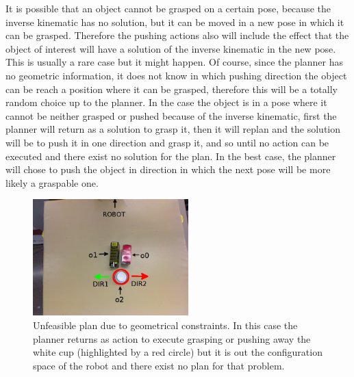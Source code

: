 

It is possible that an object cannot be grasped on a certain pose, because the inverse kinematic has no solution, but it can be moved in a new pose in which it can be grasped. Therefore the pushing actions also will include the effect that the object of interest will have a solution of the inverse kinematic in the new pose. This is usually a rare case but it might happen. Of course, since the planner has no geometric information, it does not know in which pushing direction the object can be reach a position where it can be grasped, therefore this will be a totally random choice up to the planner. In the case the object is in a pose where it cannot be neither grasped or pushed because of the inverse kinematic, first the planner will return as a solution to grasp it, then it will replan and the solution will be to push it in one direction and grasp it, and so until no action can be executed and there exist no solution for the plan. In the best case, the planner will chose to push the object in direction in which the next pose will be more likely a graspable one. 

\begin{figure}[h]
\centering
\includegraphics[width=6cm]{Img/backtracking/image4.png}
\caption{Unfeasible plan due to geometrical constraints. In this case the planner returns as action to execute grasping or pushing away the white cup (highlighted by a red circle) but it is out the configuration space of the robot and there exist no plan for that problem.} \label{fig:backtracking1}
\end{figure}

